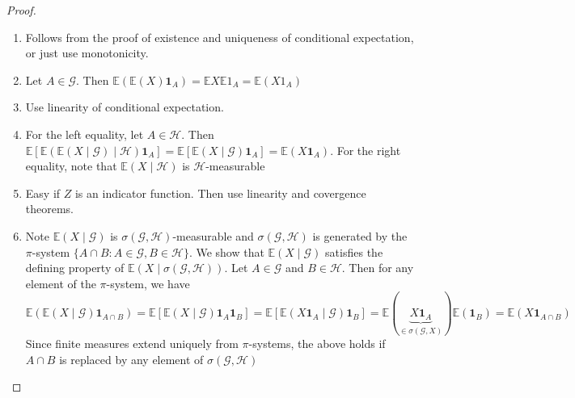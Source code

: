 \documentclass[parskip=full]{article}
\theoremstyle{definition}
\newcommand{\1}{\mathbbm{1}}
\newcommand{\E}{\mathbb{E}}
\begin{document}
\begin{proof}
  \begin{enumerate}
    \item Follows from the proof of existence and uniqueness of conditional expectation, or just use monotonicity.
    \item Let $A \in \mathcal{G}$. Then $\E( \E(X) \mathbf{1}_A) = \E X \E 1_A = \E (X 1_A)$
    \item Use linearity of conditional expectation.
    \item For the left equality, let $A \in \mathcal{H}$. Then $\E\left[\E(\E(X \mid \mathcal{G}) \mid \mathcal{H}) \mathbf{1}_A \right] = \E [\E(X \mid \mathcal{G}) \mathbf{1}_A] = \E(X \mathbf{1}_A)$. For the right equality, note that $\E(X \mid \mathcal{H})$ is $\mathcal{H}$-measurable
    \item Easy if $Z$ is an indicator function. Then use linearity and covergence theorems.
    \item Note $\E (X \mid \mathcal{G})$ is $\sigma(\mathcal{G}, \mathcal{H})$-measurable and $\sigma(\mathcal{G}, \mathcal{H})$ is generated by the $\pi$-system $\{A \cap B: A \in \mathcal{G}, B \in \mathcal{H}\}$. We show that $\E(X \mid \mathcal{G})$ satisfies the defining property of $\E(X \mid \sigma(\mathcal{G}, \mathcal{H}))$. Let $A \in \mathcal{G}$ and $B \in \mathcal{H}$. Then for any element of the $\pi$-system, we have
          \[
            \E(\E(X \mid \mathcal{G}) \mathbf{1}_{A \cap B}) = \E [\E(X \mid \mathcal{G}) \mathbf{1}_A \mathbf{1}_B] = \E [\E(X \mathbf{1}_A \mid \mathcal{G}) \mathbf{1}_B] = \E(\underbrace{X \mathbf{1}_A}_{\in \sigma(\mathcal{G}, X)}) \E(\mathbf{1}_B) = \E(X \mathbf{1}_{A \cap B})
          \]
          Since finite measures extend uniquely from $\pi$-systems, the above holds if $A\cap B$ is replaced by any element of $\sigma(\mathcal{G}, \mathcal{H})$
  \end{enumerate}
\end{proof}
\end{document}
